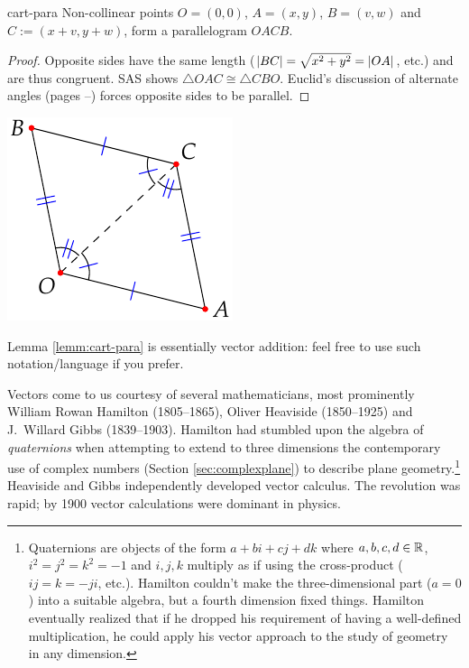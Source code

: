 \begin{minipage}[t]{0.74\linewidth}\vspace{0pt}
	\begin{lemm}{}{cart-para}
		Non-collinear points $O=(0,0)$, $A=(x,y)$, $B=(v,w)$ and $C:=(x+v,y+w)$, form a parallelogram $OACB$.
	\end{lemm}
	
	\begin{proof}
		Opposite sides have the same length ($\left| BC\right|=\sqrt{x^2+y^2}=\left| OA\right|$, etc.) and are thus congruent. SAS shows $\triangle OAC\cong \triangle CBO$. Euclid's discussion of alternate angles (pages \pageref{defn:parallel}--\pageref*{axiom:playfair}) forces opposite sides to be parallel.
	\end{proof}
\end{minipage}
\hfill
\begin{minipage}[t]{0.25\linewidth}\vspace{0pt}
	\flushright\includegraphics[scale=0.9]{analytic-para}
\end{minipage}\medbreak

Lemma \ref{lemm:cart-para} is essentially vector addition: feel free to use such notation/language if you prefer.

\goodbreak


\iffalse
{}

Vectors come to us courtesy of several mathematicians, most prominently William Rowan Hamilton (1805--1865), Oliver Heaviside (1850--1925) and J.~Willard Gibbs (1839--1903). Hamilton had stumbled upon the algebra of \emph{quaternions} when attempting to extend to three dimensions the contemporary use of complex numbers (Section \ref{sec:complexplane}) to describe plane geometry.\footnote{Quaternions are objects of the form $a+bi+cj+dk$ where $a,b,c,d\in\mathbb{R}$, $i^2=j^2=k^2=-1$ and $i,j,k$ multiply as if using the cross-product ($ij=k=-ji$, etc.). Hamilton couldn't make the three-dimensional part ($a=0$) into a suitable algebra, but a fourth dimension fixed things. Hamilton eventually realized that if he dropped his requirement of having a well-defined multiplication, he could apply his vector approach to the study of geometry in any dimension. %
} Heaviside and Gibbs %
independently developed vector calculus. The revolution was rapid; by 1900 vector calculations were dominant in physics. 

